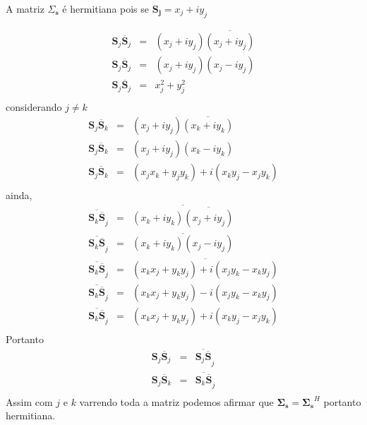 \documentclass[12pt,a4paper]{article}
\begin{document}
A matriz {\boldmath$\Sigma_{\mathbf{s}}$} é hermitiana pois se $\mathbf {S_j}= x_j+iy_j $

\begin{equation}\label{eqn3}
\begin{array}{ccc}
\mathbf{S}_j\overline{\mathbf{S}}_j&=& (x_j+iy_j)\overline{(x_j+iy_j)} \\
\mathbf{S}_j\overline{\mathbf{S}}_j&=& (x_j+iy_j)(x_j-iy_j) \\
\mathbf{S}_j\overline{\mathbf{S}}_j&=& x_j^2+y_j^2 \\
\end{array}
\end{equation}
considerando $j \neq k$
\begin{equation}\label{eqn4}
\begin{array}{ccc}
\mathbf{S}_j\overline{\mathbf{S}}_k&=& (x_j+iy_j)\overline{(x_k+iy_k)} \\
\mathbf{S}_j\overline{\mathbf{S}}_k&=& (x_j+iy_j)(x_k-iy_k) \\
\mathbf{S}_j\overline{\mathbf{S}}_k&=& (x_jx_k+y_jy_k)+i(x_ky_j-x_jy_k) \\
\end{array}
\end{equation}
ainda,
\begin{equation}\label{eqn5}
\begin{array}{ccc}
	\overline{\mathbf{S}_k\overline{\mathbf{S}}}_j&=&\overline{ (x_k+iy_k)\overline{(x_j+iy_j)} }\\
	\overline{\mathbf{S}_k\overline{\mathbf{S}}}_j&=&\overline{ (x_k+iy_k)(x_j-iy_j)} \\
	\overline{\mathbf{S}_k\overline{\mathbf{S}}}_j&=&\overline{ (x_kx_j+y_ky_j)+i(x_jy_k-x_ky_j) }\\
	\overline{\mathbf{S}_k\overline{\mathbf{S}}}_j&=&(x_kx_j+y_ky_j)-i(x_jy_k-x_ky_j) \\
	\overline{\mathbf{S}_k\overline{\mathbf{S}}}_j&=&(x_kx_j+y_ky_j)+i(x_ky_j-x_jy_k) \\
\end{array}
\end{equation}
Portanto
\begin{equation}\label{eqn6}
\begin{array}{ccc}
	\mathbf{S}_j\overline{\mathbf{S}}_j&=&\overline{\mathbf{S}_j\overline{\mathbf {S}}}_j \\
	\mathbf{S}_j\overline{\mathbf{S}}_k&=&\overline{\mathbf{S}_k\overline{\mathbf {S}}}_j \\
\end{array}
\end{equation}
Assim com $j$ e $k$ varrendo toda a matriz podemos afirmar que $\mathbf{\Sigma_{\mathbf{s}}}=\mathbf{\Sigma_{ s}}^H$ portanto hermitiana.
\end{document}
